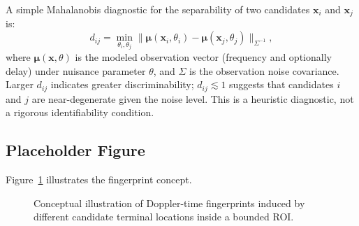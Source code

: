 A simple Mahalanobis diagnostic for the separability of two candidates
$\mathbf{x}_i$ and $\mathbf{x}_j$ is:
\begin{equation}
  d_{ij}
  = \min_{\theta_i,\theta_j}
    \bigl\|
      \boldsymbol{\mu}(\mathbf{x}_i, \theta_i)
      - \boldsymbol{\mu}(\mathbf{x}_j, \theta_j)
    \bigr\|_{\Sigma^{-1}} ,
  \label{eq:fingerprint_distance}
\end{equation}
where $\boldsymbol{\mu}(\mathbf{x},\theta)$ is the modeled observation vector
(frequency and optionally delay) under nuisance parameter $\theta$, and
$\Sigma$ is the observation noise covariance.
Larger $d_{ij}$ indicates greater discriminability; $d_{ij}\lesssim 1$ suggests
that candidates $i$ and $j$ are near-degenerate given the noise level.
This is a heuristic diagnostic, not a rigorous identifiability condition.

\subsection{Placeholder Figure}
Figure~\ref{fig:dtf_concept} illustrates the fingerprint concept.
\begin{figure}[tbp]
  \centering
  \caption{Conceptual illustration of Doppler-time fingerprints induced by
           different candidate terminal locations inside a bounded ROI.}
  \label{fig:dtf_concept}
\end{figure}